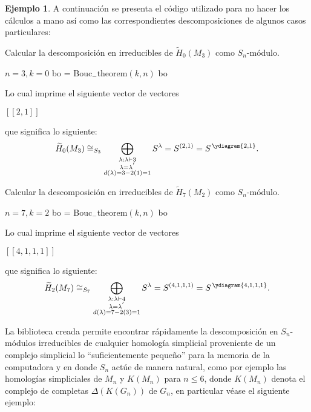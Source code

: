 \documentclass[12pt]{book}
\theoremstyle{definition}
\newtheorem{example}[theorem]{Ejemplo}
\newcounter{in}
\begin{document}
\begin{example}
  A continuación se presenta el código utilizado para no hacer los
  cálculos a mano así como las correspondientes descomposiciones de algunos casos particulares:
  \quad
\begin{algorithm}[H]
  \caption{Calcular la descomposición en irreducibles de
    $\widetilde H_{0}(M_3)$ como $S_n$-módulo.}
\begin{algorithmic}
\STATE $n = 3, k = 0$
\STATE bo = Bouc$_{-}$theorem$(k,n)$
\PRINT bo
\end{algorithmic}
\end{algorithm}  
Lo cual imprime el siguiente vector de vectores
\begin{center}
$\left [ \left [ 2,1 \right ] \right ]$ 
\end{center}
que significa lo siguiente:
  \begin{equation*}
    \widetilde H_{0}(M_{3})\cong_{S_{3}}\bigoplus_{\substack{\lambda:\lambda\vdash 3\\
        \lambda=\lambda^{'}\\d(\lambda)=3-2(1)=1}} S^{\lambda}=S^{(2,1)} = S^{\,\ydiagram{2,1}}.
  \end{equation*}
\begin{algorithm}[H]
  \caption{Calcular la descomposición en irreducibles de
    $\widetilde H_{7}(M_2)$ como $S_n$-módulo.}
\begin{algorithmic}
\STATE $n = 7, k = 2$
\STATE bo = Bouc$_{-}$theorem$(k,n)$
\PRINT bo
\end{algorithmic}
\end{algorithm}  
Lo cual imprime el siguiente vector de vectores
\begin{center}
$\left [ \left [ 4,1,1,1 \right ] \right ]$ 
\end{center}
que significa lo siguiente:
  \begin{equation*}
    \widetilde H_{2}(M_{7})\cong_{S_{7}}\bigoplus_{\substack{\lambda:\lambda\vdash 4\\
        \lambda=\lambda^{'}\\d(\lambda)=7-2(3)=1}} S^{\lambda}=S^{(4,1,1,1)} = S^{\,\ydiagram{4,1,1,1}}.
  \end{equation*}
\end{example}
La biblioteca creada permite encontrar
rápidamente la descomposición en $S_{n}$-módulos irreducibles de cualquier
homología simplicial proveniente de un complejo simplicial lo ``suficientemente pequeño'' para la memoria de
la computadora y en donde $S_{n}$ actúe de manera natural, como por ejemplo las homologías simpliciales de $M_n$ y $K(M_n)$
para $n \leq 6$, donde $K(M_n)$ denota el complejo de completas
$\Delta(K(G_n))$ de $G_n$, en particular véase el siguiente ejemplo:
\end{document}
